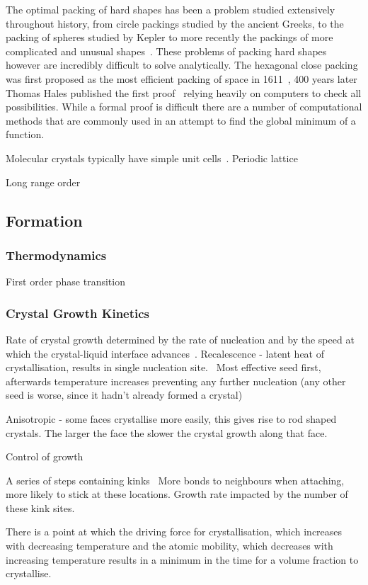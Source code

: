 The optimal packing of hard shapes has been a problem studied extensively throughout history, from circle packings studied by the ancient Greeks, to the packing of spheres studied by Kepler to more recently the packings of more complicated and unusual shapes~\cite{atkinson:12,torquato:12}. These problems of packing hard shapes however are incredibly difficult to solve analytically. The hexagonal close packing was first proposed as the most efficient packing of space in 1611~\cite{kepler:1611}, 400 years later Thomas Hales published the first proof~\cite{hales:05,hales:14} relying heavily on computers to check all possibilities. While a formal proof is difficult there are a number of computational methods that are commonly used in an attempt to find the global minimum of a function.

Molecular crystals typically have simple unit cells~\cite{brock:94}. Periodic lattice

Long range order
\subsection{Formation}
\subsubsection{Thermodynamics}
First order phase transition

\subsubsection{Crystal Growth Kinetics}
Rate of crystal growth determined by the rate of nucleation and by the speed at which the crystal-liquid interface advances~\cite{turnbull:69}.
Recalescence - latent heat of crystallisation, results in single nucleation site.~\cite{turnbull:69} Most effective seed first, afterwards temperature increases preventing any further nucleation (any other seed is worse, since it hadn't already formed a crystal)

Anisotropic - some faces crystallise more easily, this gives rise to rod shaped crystals.
The larger the face the slower the crystal growth along that face.

Control of growth~\cite{de-yoreo:03}

A series of steps containing kinks~\cite{chernov:61} More bonds to neighbours when attaching, more likely to stick at these locations. Growth rate impacted by the number of these kink sites.

There is a point at which the driving force for crystallisation, which increases with decreasing temperature and the atomic mobility, which decreases with increasing temperature results in a minimum in the time for a volume fraction to crystallise.~\cite{uhlmann:72}
\begin{figure}
\end{figure}

